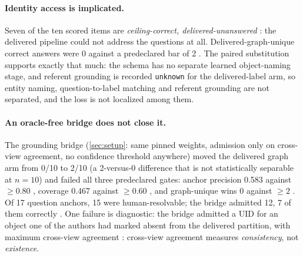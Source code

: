 \paragraph{Identity access is implicated.}
Seven of the ten scored items are \emph{ceiling-correct, delivered-unanswered} :
the delivered pipeline could not address the questions at all. Delivered-graph-unique
correct answers were 0 against a predeclared bar of 2 . The paired substitution
supports exactly that much: the schema has no separate learned object-naming stage, and
referent grounding is recorded \texttt{unknown} for the delivered-label arm, so entity
naming, question-to-label matching and referent grounding are not separated, and the
loss is not localized among them.

\paragraph{An oracle-free bridge does not close it.}
The grounding bridge (\cref{sec:setup}: same pinned weights, admission only on
cross-view agreement, no confidence threshold anywhere) moved the delivered graph arm
from 0/10  to 2/10  (a
2-versus-0 difference that is not statistically separable at $n = 10$) and
failed all three predeclared gates: anchor precision 0.583 against $\ge 0.80$ ,
coverage 0.467 against $\ge 0.60$ , and graph-unique wins 0 against $\ge 2$
. Of 17 question anchors, 15 were human-resolvable; the bridge admitted 12, 7
of them correctly . One failure is diagnostic: the bridge admitted a UID for an
object one of the authors had marked absent from the delivered partition, with maximum
cross-view agreement : cross-view agreement measures \emph{consistency}, not
\emph{existence}.

